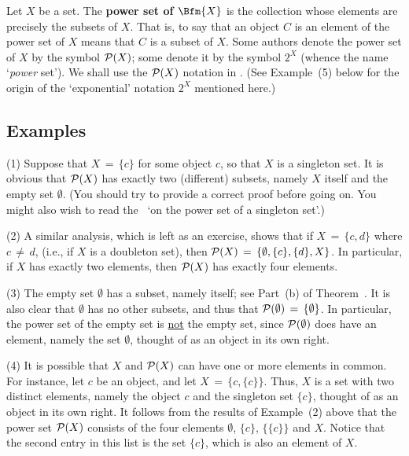         Let $X$ be a set. The {\bf power set of $\Bfm{X}$} is the collection whose elements are precisely the subsets of $X$.
    That is, to say that an object $C$ is an element of the power set of $X$ means that $C$ is a subset of $X$.
    Some authors denote the power set of $X$ by the symbol ${\cal P}(X)$; some denote it by the symbol $2^{X}$ (whence the name `{\em power} set').
    We shall use the ${\cal P}(X)$ notation in {\TheseNotes}.
    (See Example~(5) below for the origin of the `exponential' notation $2^{X}$ mentioned here.)

\V

        \subsection{\small{\bf Examples}}

\hspace*{\parindent}
        (1) Suppose that $X \,=\, \{c\}$ for some object $c$, so that $X$ is a singleton  set.
    It is obvious that ${\cal P}(X)$ has exactly two (different) subsets, namely $X$ itself and the empty set ${\emptyset}$.
    (You should try to provide a correct proof before going on. You might also wish to read the \Note\, `on the power set of a singleton set'.)

\V

        (2) A similar analysis, which is left as an exercise, shows that if $X \,=\, \{c,d\}$ where 
$c \,{\neq}\, d$, (i.e., if $X$ is a doubleton set),
    then ${\cal P}(X) \,=\, \{{\emptyset}, \{c\}, \{d\}, X\}$.
	In particular, if $X$ has exactly two elements, then ${\cal P}(X)$ has exactly four elements.

\V

        (3) The empty set ${\emptyset}$ has a subset, namely itself; see Part~(b) of Theorem~.
    It is also clear that ${\emptyset}$ has no other subsets, and thus that ${\cal P}({\emptyset}) \,=\, \{{\emptyset}\}$.
    In particular, the power set of the empty set is \underline{not} the empty set, since ${\cal P}({\emptyset})$ does have an element, namely the set ${\emptyset}$, thought of as an object in its own right.

\V

        (4) It is possible that $X$ and ${\cal P}(X)$ can have one or more elements in common.
    For instance, let $c$ be an object, and let $X \,=\, \{c,\{c\}\}$.
    Thus, $X$ is a set with two distinct elements, namely the object $c$ and the singleton set $\{c\}$, thought of as an object in its own right.
    It follows from the results of Example~(2) above that the power set ${\cal P}(X)$ consists of the four elements ${\emptyset}$, $\{c\}$, $\{\{c\}\}$ and $X$.
    Notice that the second entry in this list is the set $\{c\}$, which is also an element of $X$.

